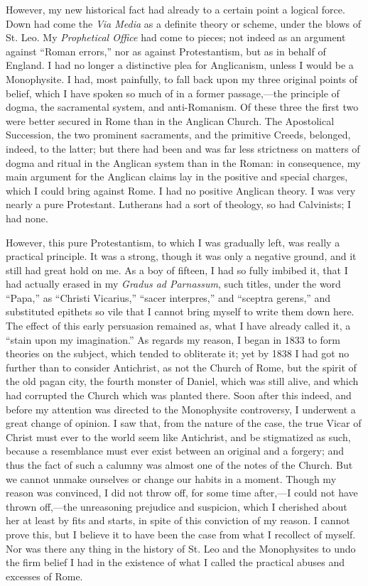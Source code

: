 However, my new historical fact had already to a certain
point a logical force. Down had come the \emph{Via Media} as a definite
theory or scheme, under the blows of St. Leo. My \emph{Prophetical
Office} had come to pieces; not indeed as an argument against
``Roman errors,'' nor as against Protestantism, but as in behalf
of England. I had no longer a distinctive plea for Anglicanism,
unless I would be a Monophysite. I had, most painfully, to fall back
upon my three original points of belief, which I have spoken so much of
in a former passage,—the principle of dogma, the sacramental system,
and anti-Romanism. Of these three the first two were better secured in
Rome than in the Anglican Church. The Apostolical Succession, the
two prominent sacraments, and the primitive Creeds, belonged, indeed, to
the latter; but there had been and was far less strictness on matters of
dogma and ritual in the Anglican system than in the Roman: in
consequence, my main argument for the Anglican claims lay in the
positive and special charges, which I could bring against Rome. I had no
positive Anglican theory. I was very nearly a pure Protestant. Lutherans
had a sort of theology, so had Calvinists; I had none.

However, this pure Protestantism, to which I was gradually left, was
really a practical principle. It was a strong, though it was only a
negative ground, and it still had great hold on me. As a boy of fifteen,
I had so fully imbibed it, that I had actually erased in my \emph{Gradus ad
Parnassum}, such titles, under the word ``Papa,'' as
``Christi Vicarius,'' ``sacer interpres,'' and ``sceptra
gerens,'' and substituted epithets so vile that I cannot bring
myself to write them down here. The effect of this early persuasion
remained as, what I have already called it, a ``stain upon my
imagination.'' As regards my reason, I began in 1833 to form
theories on the subject, which tended to obliterate it; yet by 1838 I
had got no further than to consider Antichrist, as not the Church of
Rome, but the spirit of the old pagan city, the fourth monster of
Daniel, which was still alive, and which had corrupted the Church which
was planted there. Soon after this indeed, and before my attention was
directed to the Monophysite controversy, I underwent a great change of
opinion. I saw that, from the nature of the case, the true Vicar of
Christ must ever to the world seem like Antichrist, and be stigmatized
as such, because a resemblance must ever exist between an original and a
forgery; and thus the fact of such a calumny was almost one of the notes
of the Church. But we cannot
unmake ourselves or change our habits in a moment. Though my reason was
convinced, I did not throw off, for some time after,—I could not have thrown
off,—the unreasoning prejudice and suspicion, which I
cherished about her at least by fits and starts,
in spite of this conviction of my reason. I cannot prove this,
but I believe it to have been the case from what I recollect of myself.
Nor was there any thing in the history of St. Leo and the Monophysites
to undo the firm belief I had in the existence of what I called the
practical abuses and excesses of Rome.

